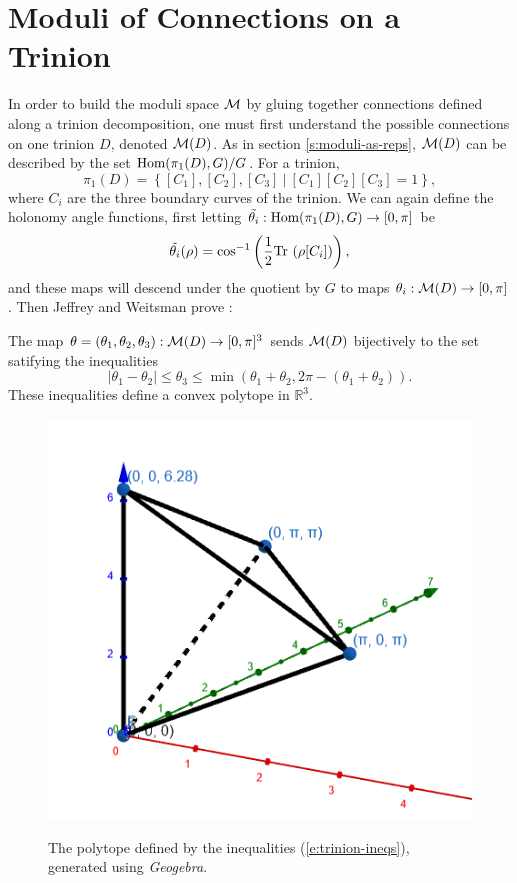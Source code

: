 \section{Moduli of Connections on a Trinion}
	In order to build the moduli space $\mathcal{M}$ by gluing together connections defined along a trinion decomposition, one must first understand the possible connections on one trinion $D$, denoted $\mathcal{M}(D)$. As in section \ref{s:moduli-as-reps}, $\mathcal{M}(D)$ can be described by the set $\text{Hom}(\pi_1(D),G)/G$. For a trinion, 
	\begin{equation}
		\pi_1(D) = \left\{
		[C_1], [C_2], [C_3] ~|~ [C_1][C_2][C_3]  =1
		\right\},
	\end{equation}
	where $C_i$ are the three boundary curves of the trinion. We can again define the holonomy angle functions, first letting $\tilde{\theta_i}:\text{Hom}(\pi_1(D),G) \to [0,\pi]$ be
	\begin{equation}
		\label{e:thetacoords}
		\tilde{\theta_i}(\rho) = \cos^{-1}\left(\frac{1}{2}\text{Tr }(\rho[C_i])\right),
	\end{equation}
	and these maps will descend under the quotient by $G$ to maps $\theta_i:\mathcal{M}(D)\to [0,\pi]$. Then Jeffrey and Weitsman prove \cite[Proposition 3.1]{jeffrey_bohr-sommerfeld_1992}:
	\begin{theorem}[]
		The map $\theta = (\theta_1, \theta_2, \theta_3):\mathcal{M}(D)\to[0,\pi]^3$ sends $\mathcal{M}(D)$ bijectively to the set satifying the inequalities
		\begin{equation}
			|\theta_1 - \theta_2| \leq \theta_3 \leq \min(\theta_1 + \theta_2, 2\pi - (\theta_1 + \theta_2)).
			\label{e:trinion-ineqs}
		\end{equation}
		These inequalities define a convex polytope in $\mathbb{R}^3$.
	\end{theorem}

	\begin{figure}[h]
	\centering
	\includegraphics[width=0.5\linewidth]{polytope.png}\label{fig:polytope}
	\caption{The polytope defined by the inequalities (\ref{e:trinion-ineqs}), generated using \emph{Geogebra}.}
	\end{figure}

